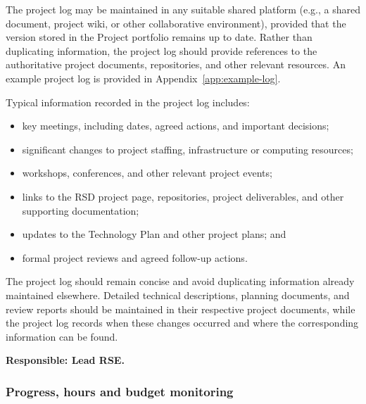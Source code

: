 The project log may be maintained in any suitable shared platform (e.g., a shared document, project wiki, or other
collaborative environment), provided that the version stored in the Project portfolio remains up to date. Rather than
duplicating information, the project log should provide references to the authoritative project documents, repositories,
and other relevant resources. An example project log is provided in Appendix~\ref{app:example-log}.

Typical information recorded in the project log includes:
\vspace{-0.2cm}
\begin{itemize}[itemsep=-4pt,parsep=4pt]
\item key meetings, including dates, agreed actions, and important decisions;
\item significant changes to project staffing, infrastructure or computing resources;
\item workshops, conferences, and other relevant project events;
\item links to the RSD project page, repositories, project deliverables, and other supporting documentation; 
\item updates to the Technology Plan and other project plans; and
\item formal project reviews and agreed follow-up actions.
\end{itemize}
\vspace{-0.2cm}

The project log should remain concise and avoid duplicating information already maintained elsewhere. Detailed 
technical descriptions, planning documents, and review reports should be maintained in their respective project 
documents, while the project log records when these changes occurred and where the corresponding information can be 
found.

\textbf{Responsible: Lead RSE.}

\subsubsection{Progress, hours and budget monitoring}
\label{sec:exec:progress}

